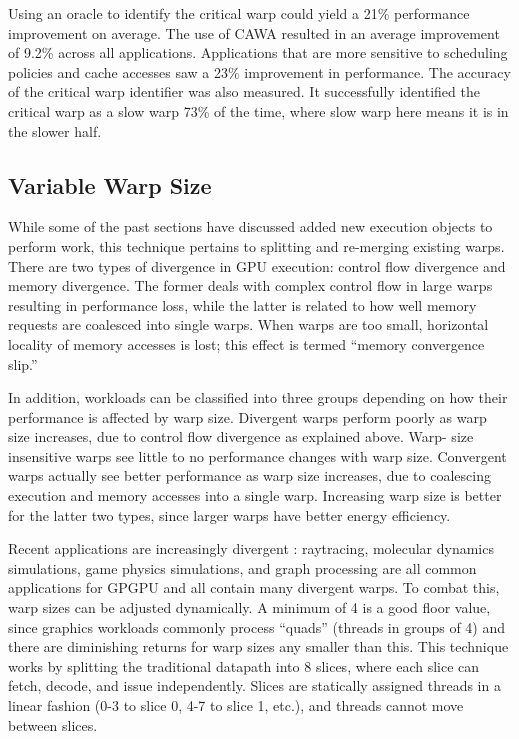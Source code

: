 \documentclass[prodmode,acmtecs]{acmsmall} %
\begin{document}
Using an oracle to identify the critical warp could yield a 21\% performance
improvement on average. The use of CAWA resulted in an average improvement of
9.2\% across all applications. Applications that are more sensitive to
scheduling policies and cache accesses saw a 23\% improvement in performance.
The accuracy of the critical warp identifier was also measured. It successfully
identified the critical warp as a slow warp 73\% of the time, where slow warp
here means it is in the slower half.

\subsection{Variable Warp Size}
While some of the past sections have discussed added new execution objects to
perform work, this technique pertains to splitting and re-merging existing
warps. There are two types of divergence in GPU execution: control flow
divergence and memory divergence. The former deals with complex control flow in
large warps resulting in performance loss, while the latter is related to how
well memory requests are coalesced into single warps. When warps are too small,
horizontal locality of memory accesses is lost; this effect is termed ``memory
convergence slip.''

In addition, workloads can be classified into three groups depending on how
their performance is affected by warp size. Divergent warps perform poorly as
warp size increases, due to control flow divergence as explained above. Warp-
size insensitive warps see little to no performance changes with warp size.
Convergent warps actually see better performance as warp size increases, due to
coalescing execution and memory accesses into a single warp. Increasing warp
size is better for the latter two types, since larger warps have better energy
efficiency.

Recent applications are increasingly divergent
\cite{VariableWarpSize}: raytracing, molecular dynamics simulations, game
physics simulations, and graph processing are all common applications for GPGPU
and all contain many divergent warps. To combat this, warp sizes can be adjusted
dynamically. A minimum of 4 is a good floor value, since graphics workloads
commonly process ``quads'' (threads in groups of 4) and there are diminishing
returns for warp sizes any smaller than this. This technique works by splitting
the traditional datapath into 8 slices, where each slice can fetch, decode, and
issue independently. Slices are statically assigned threads in a linear fashion
(0-3 to slice 0, 4-7 to slice 1, etc.), and threads cannot move between slices.
\end{document}
